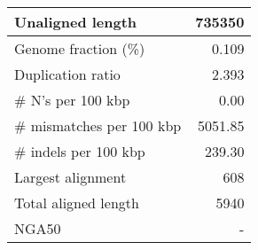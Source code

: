 \documentclass[12pt,a4paper]{article}
\begin{document}
\begin{table}[ht]
\begin{center}
\begin{tabular}{|l*{1}{|r}|}
Unaligned length & 735350 \\ \hline
Genome fraction (\%) & 0.109 \\ \hline
Duplication ratio & 2.393 \\ \hline
\# N's per 100 kbp & 0.00 \\ \hline
\# mismatches per 100 kbp & 5051.85 \\ \hline
\# indels per 100 kbp & 239.30 \\ \hline
Largest alignment & 608 \\ \hline
Total aligned length & 5940 \\ \hline
NGA50 & - \\ \hline
\end{tabular}
\end{center}
\end{table}
\end{document}
